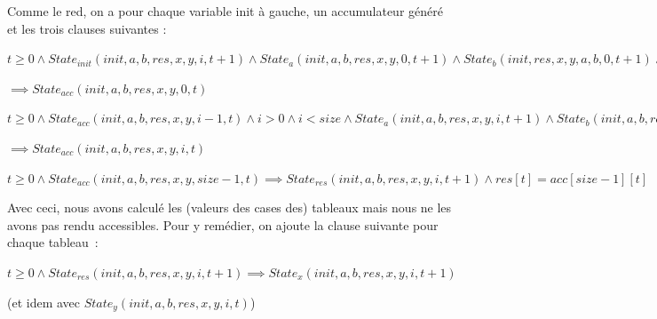 Comme le red, on a pour chaque variable init à gauche, un accumulateur généré
et les trois clauses suivantes :

\begin{center} $t \geq 0 \wedge State_{init}(init,a,b,res,x,y,i,t+1)
  \wedge State_a(init,a,b,res,x,y,0,t+1)\wedge State_b(init,res,x,y,a,b,0,t+1)
  \wedge Interface_{test}(init,a[0],b[0],acc[0],x[0],y[0],t+1) $

  $\implies State_{acc}(init,a,b,res,x,y,0,t)  $
\end{center}

\begin{center} $t \geq 0 \wedge State_{acc}(init,a,b,res,x,y,i-1,t)
  \wedge i > 0 \wedge i<size
  \wedge State_a(init,a,b,res,x,y,i,t+1)\wedge State_b(init,a,b,res,x,y,i,t+1)
  \wedge Interface_{test}(acc[i-1],a[i],b[i],acc[i],x[i],y[i],t+1) $

   $\implies State_{acc}(init,a,b,res,x,y,i,t) $
\end{center}

\begin{center} $t \geq 0 \wedge State_{acc}(init,a,b,res,x,y,size-1,t)
  \implies State_{res}(init,a,b,res,x,y,i,t+1) \wedge res[t] = acc[size-1][t] $
\end{center}

Avec ceci, nous avons calculé les (valeurs des cases des) tableaux mais nous ne les avons pas rendu accessibles.
Pour y remédier, on ajoute la clause suivante pour chaque tableau~:

$t \geq 0 \wedge State_{res}(init,a,b,res,x,y,i,t+1)
\implies State_x(init,a,b,res,x,y,i,t+1) $

(et idem avec $State_{y}(init,a,b,res,x,y,i,t)$)


